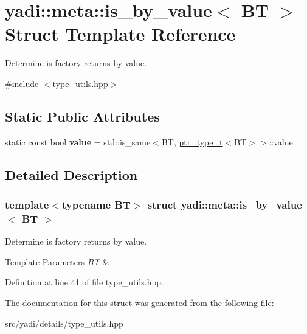 \hypertarget{structyadi_1_1meta_1_1is__by__value}{}\section{yadi\+:\+:meta\+:\+:is\+\_\+by\+\_\+value$<$ BT $>$ Struct Template Reference}
\label{structyadi_1_1meta_1_1is__by__value}


Determine is factory returns by value.  




{\ttfamily \#include $<$type\+\_\+utils.\+hpp$>$}

\subsection*{Static Public Attributes}
\begin{DoxyCompactItemize}
\item 
\mbox{\label{structyadi_1_1meta_1_1is__by__value_a430929d9f810b08e62a35550240aa925}} 
static const bool {\bfseries value} = std\+::is\+\_\+same$<$BT, \hyperlink{namespaceyadi_a92290eb27cd90666aa87b17d854af9fe}{ptr\+\_\+type\+\_\+t}$<$BT$>$$>$\+::value
\end{DoxyCompactItemize}


\subsection{Detailed Description}
\subsubsection*{template$<$typename BT$>$\newline
struct yadi\+::meta\+::is\+\_\+by\+\_\+value$<$ B\+T $>$}

Determine is factory returns by value. 


\begin{DoxyTemplParams}{Template Parameters}
{\em BT} & \\
\hline
\end{DoxyTemplParams}


Definition at line 41 of file type\+\_\+utils.\+hpp.



The documentation for this struct was generated from the following file\+:\begin{DoxyCompactItemize}
\item 
src/yadi/details/type\+\_\+utils.\+hpp\end{DoxyCompactItemize}
